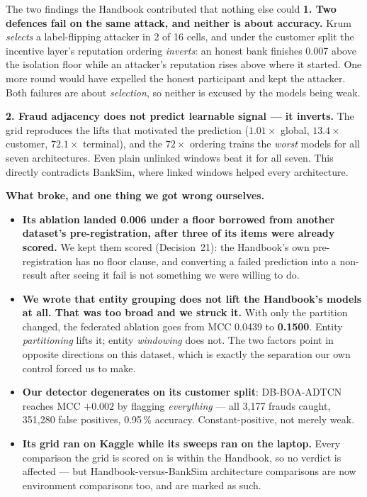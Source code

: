 \documentclass[11pt]{article}
\begin{document}
\begin{keybox}{The two findings the Handbook contributed that nothing else could}
\textbf{1. Two defences fail on the same attack, and neither is about accuracy.} Krum \emph{selects} a
label-flipping attacker in 2 of 16 cells, and under the customer split the incentive layer's reputation
ordering \emph{inverts}: an honest bank finishes 0.007 above the isolation floor while an attacker's
reputation rises above where it started. One more round would have expelled the honest participant and
kept the attacker. Both failures are about \emph{selection}, so neither is excused by the models being
weak.

\textbf{2. Fraud adjacency does not predict learnable signal --- it inverts.} The grid reproduces the
lifts that motivated the prediction ($1.01\times$ global, $13.4\times$ customer, $72.1\times$ terminal),
and the $72\times$ ordering trains the \emph{worst} models for all seven architectures. Even plain
unlinked windows beat it for all seven. This directly contradicts BankSim, where linked windows helped
every architecture.
\end{keybox}

\textbf{What broke, and one thing we got wrong ourselves.}
\begin{itemize}\itemsep2pt
  \item \textbf{Its ablation landed 0.006 under a floor borrowed from another dataset's pre-registration,
        after three of its items were already scored.} We kept them scored (Decision~21): the Handbook's
        own pre-registration has no floor clause, and converting a failed prediction into a non-result
        after seeing it fail is not something we were willing to do.
  \item \textbf{We wrote that entity grouping does not lift the Handbook's models at all. That was too
        broad and we struck it.} With only the partition changed, the federated ablation goes from MCC
        0.0439 to \textbf{0.1500}. Entity \emph{partitioning} lifts it; entity \emph{windowing} does not.
        The two factors point in opposite directions on this dataset, which is exactly the separation our
        own control forced us to make.
  \item \textbf{Our detector degenerates on its customer split}: DB-BOA-ADTCN reaches MCC $+0.002$ by
        flagging \emph{everything} --- all 3{,}177 frauds caught, 351{,}280 false positives, 0.95\,\%
        accuracy. Constant-positive, not merely weak.
  \item \textbf{Its grid ran on Kaggle while its sweeps ran on the laptop.} Every comparison the grid is
        scored on is within the Handbook, so no verdict is affected --- but Handbook-versus-BankSim
        architecture comparisons are now environment comparisons too, and are marked as such.
\end{itemize}
\end{document}
